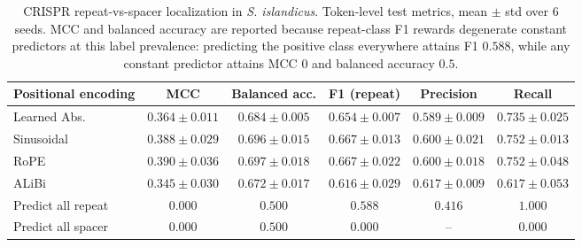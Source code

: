 \begin{table}[t]
\centering
\caption{CRISPR repeat-vs-spacer localization in \textit{S. islandicus}. Token-level test metrics, mean $\pm$ std over 6 seeds. MCC and balanced accuracy are reported because repeat-class F1 rewards degenerate constant predictors at this label prevalence: predicting the positive class everywhere attains F1 $0.588$, while any constant predictor attains MCC $0$ and balanced accuracy $0.5$.}
\label{tab:pe-results}
\begin{tabular}{lccccc}
\toprule
Positional encoding & MCC & Balanced acc. & F1 (repeat) & Precision & Recall \\
\midrule
Learned Abs. & $0.364 \pm 0.011$ & $0.684 \pm 0.005$ & $0.654 \pm 0.007$ & $0.589 \pm 0.009$ & $0.735 \pm 0.025$ \\
Sinusoidal & $0.388 \pm 0.029$ & $0.696 \pm 0.015$ & $0.667 \pm 0.013$ & $0.600 \pm 0.021$ & $0.752 \pm 0.013$ \\
RoPE & $0.390 \pm 0.036$ & $0.697 \pm 0.018$ & $0.667 \pm 0.022$ & $0.600 \pm 0.018$ & $0.752 \pm 0.048$ \\
ALiBi & $0.345 \pm 0.030$ & $0.672 \pm 0.017$ & $0.616 \pm 0.029$ & $0.617 \pm 0.009$ & $0.617 \pm 0.053$ \\
\midrule
Predict all repeat & $0.000$ & $0.500$ & $0.588$ & $0.416$ & $1.000$ \\
Predict all spacer & $0.000$ & $0.500$ & $0.000$ & -- & $0.000$ \\
\bottomrule
\end{tabular}
\end{table}